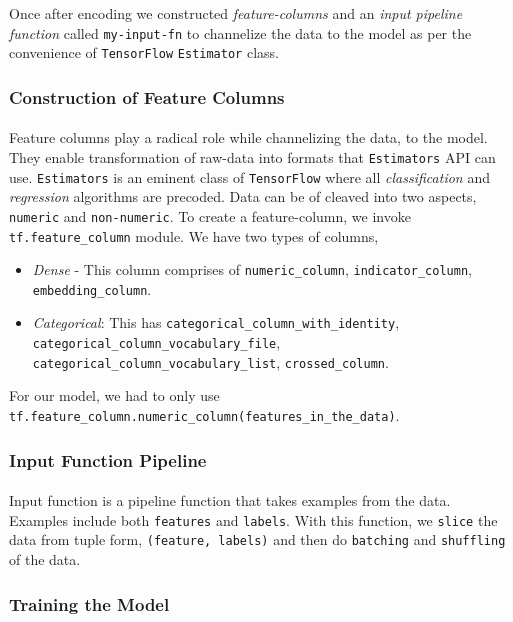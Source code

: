 \documentclass[letterpaper, 11pt]{article}
\begin{document}
Once after encoding we constructed \textit{feature-columns} and an \textit{input pipeline function} called \texttt{my-input-fn} to channelize the data to the model as per the convenience of \texttt{TensorFlow} \texttt{Estimator} class.

\subsubsection*{Construction of Feature Columns}
\paragraph{} Feature columns play a radical role while channelizing the data, to the model. They enable transformation of raw-data into formats that \texttt{Estimators} API can use. \texttt{Estimators} is an eminent class of \texttt{TensorFlow} where all \textit{classification} and \textit{regression} algorithms are precoded. Data can be of cleaved into two aspects, \texttt{numeric} and \texttt{non-numeric}. To create a feature-column, we invoke \verb!tf.feature_column! module. We have two types of columns,
\begin{itemize}
\item \textit{Dense} - This column comprises of \verb!numeric_column!, \verb!indicator_column!, \verb!embedding_column!.
\item \textit{Categorical}: This has \verb!categorical_column_with_identity!, \verb!categorical_column_vocabulary_file!, \verb!categorical_column_vocabulary_list!, \verb!crossed_column!.
\end{itemize}
For our model, we had to only use \verb!tf.feature_column.numeric_column(features_in_the_data)!.

\subsubsection*{Input Function Pipeline}
\paragraph{} Input function is a pipeline function that takes examples from the data. Examples include both \texttt{features} and \texttt{labels}. With this function, we \texttt{slice} the data from tuple form, \verb!(feature, labels)! and then do \texttt{batching} and \texttt{shuffling} of the data.

\subsubsection*{Training the Model}
\end{document}
